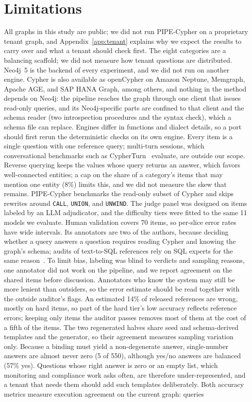 \documentclass[11pt]{article}
\newcommand{\cy}[1]{\texttt{\small #1}}
\begin{document}
\section*{Limitations}
All graphs in this study are public; we did not run PIPE-Cypher on a proprietary tenant graph, and Appendix~\ref{app:tenant} explains why we expect the results to carry over and what a tenant should check first. The eight categories are a balancing scaffold; we did not measure how tenant questions are distributed. Neo4j~5 is the backend of every experiment, and we did not run on another engine. Cypher is also available as openCypher on Amazon Neptune, Memgraph, Apache AGE, and SAP HANA Graph, among others, and nothing in the method depends on Neo4j: the pipeline reaches the graph through one client that issues read-only queries, and its Neo4j-specific parts are confined to that client and the schema reader (two introspection procedures and the syntax check), which a schema file can replace. Engines differ in functions and dialect details, so a port should first rerun the deterministic checks on its own engine. Every item is a single question with one reference query; multi-turn sessions, which conversational benchmarks such as CypherTurn~\citep{cypherturn2026} evaluate, are outside our scope. Reverse querying keeps the values whose query returns an answer, which favors well-connected entities; a cap on the share of a category's items that may mention one entity (8\%) limits this, and we did not measure the skew that remains. PIPE-Cypher benchmarks the read-only subset of Cypher and skips rewrites around \cy{CALL}, \cy{UNION}, and \cy{UNWIND}. The judge panel was designed on items labeled by an LLM adjudicator, and the difficulty tiers were fitted to the same 11 models we evaluate. Human validation covers 70 items, so per-slice error rates have wide intervals. Its annotators are two of the authors, because deciding whether a query answers a question requires reading Cypher and knowing the graph's schema; audits of text-to-SQL references rely on SQL experts for the same reason~\citep{wretblad2024noise,jin2026pervasive}. To limit bias, labeling was blind to verdicts and sampling reasons, one annotator did not work on the pipeline, and we report agreement on the shared items before discussion. Annotators who know the system may still be more lenient than outsiders, so the error estimate should be read together with the outside auditor's flags. An estimated 14\% of released references are wrong, mostly on hard items, so part of the hard tier's low accuracy reflects reference errors; keeping only items the auditor passes removes most of them at the cost of a fifth of the items. The two regenerated halves share seed and schema-derived templates and the generator, so their agreement measures sampling variation only. Because a binding must yield a non-degenerate answer, single-number answers are almost never zero (5 of 550), although yes/no answers are balanced (57\% yes). Questions whose right answer is zero or an empty list, which monitoring and compliance work asks often, are therefore under-represented, and a tenant that needs them should add such templates deliberately. Both accuracy metrics measure execution agreement on the current graph: queries 
\end{document}
